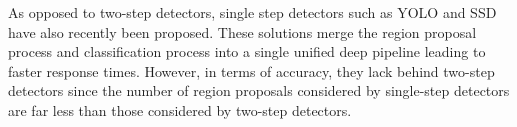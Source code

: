 As opposed to two-step detectors, single step detectors such as YOLO\cite{redmon2016you,redmon2018yolov3} and SSD\cite{liu2016ssd} have also recently been proposed. These solutions merge the region proposal process and classification process into a single unified deep pipeline leading to faster response times. However, in terms of accuracy, they lack behind two-step detectors since the number of region proposals considered by single-step detectors are far less than those considered by two-step detectors\cite{redmon2018yolov3}. 










